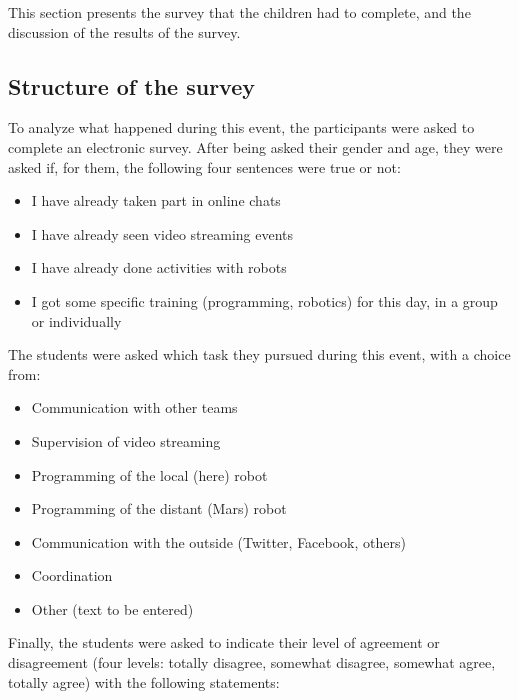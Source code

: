 \documentclass{intech-journal}
\begin{document}
This section presents the survey that the children had to complete, and the discussion of the results of the survey. 

\subsection{Structure of the survey}

To analyze what happened during this event, the participants were asked to complete an electronic survey.
After being asked their gender and age, they were asked if, for them, the following four sentences were true or not:
\begin{itemize}[noitemsep,nolistsep]
\item I have already taken part in online chats 	
\item I have already seen video streaming events 	
\item I have already done activities with robots 
\item I got some specific training (programming, robotics) for this day, in a group or individually
\end{itemize}
The students were asked which task they pursued during this event, with a choice from:
\begin{itemize}[noitemsep,nolistsep]
\item Communication with other teams
\item Supervision of video streaming
\item Programming of the local (here) robot
\item Programming of the distant (Mars) robot
\item Communication with the outside (Twitter, Facebook, others)
\item Coordination
\item Other (text to be entered)
\end{itemize}
Finally, the students were asked to indicate their level of agreement or disagreement (four levels: totally disagree, somewhat disagree, somewhat agree, totally agree) with the following statements:
\end{document}

